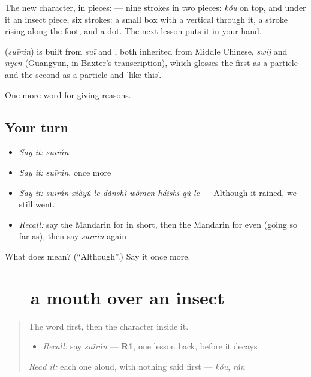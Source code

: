 The new character, in pieces:  — nine strokes in two pieces:  \emph{kǒu} on top, and under it an insect piece, six strokes: a small box with a vertical through it, a stroke rising along the foot, and a dot. The next lesson puts it in your hand.

\begin{cousinweb}
\textbf{} (\emph{suīrán}) is built from \emph{suī} and , both inherited from Middle Chinese, \emph{swij} and \emph{nyen} (Guangyun, in Baxter's transcription), which glosses the first as a particle and the second as a particle and 'like this'.
\end{cousinweb}

\begin{grammarlens}[title={What you've built}]
One more word for giving reasons.
\end{grammarlens}

\subsection*{Your turn}
\begin{itemize}
\raggedright
  \item \emph{Say it:} \emph{suīrán}
  \item \emph{Say it:} \emph{suīrán}, once more
  \item \emph{Say it:} \emph{suīrán xiàyǔ le dànshì wǒmen háishi qù le} — Although it rained, we still went.
  \item \emph{Recall:} say the Mandarin for in short, then the Mandarin for even (going so far as), then say \emph{suīrán} again
\end{itemize}

\begin{tcolorbox}[breakable,colback=teal!4,colframe=teal!35!black,title={Before you move on}]
What does  mean? (\textquotedblleft{}Although\textquotedblright{}.) Say it once more.
\end{tcolorbox}
\section[\texorpdfstring{\zh{虽} (suī)}{虽 (suī)}]{ — a mouth over an insect}

\label{lesson:ZH-W371-sui-though}



\begin{quote}
The word first, then the character inside it.

\begin{itemize}
\raggedright
  \item \emph{Recall:} say \emph{suīrán} — \textbf{R1}, one lesson back, before it decays
\end{itemize}

\begin{quote}
 
\end{quote}

\emph{Read it:} each one aloud, with nothing said first — \emph{kǒu}, \emph{rán}
\end{quote}

